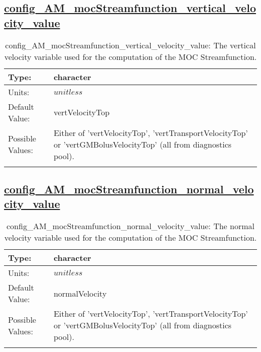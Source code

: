 \subsection[config\_AM\_mocStreamfunction\_vertical\_velocity\_value]{\hyperref[sec:nm_tab_AM_mocStreamfunction]{config\_AM\_mocStreamfunction\_vertical\_velocity\_value}}
\label{subsec:nm_sec_config_AM_mocStreamfunction_vertical_velocity_value}
\begin{center}
\begin{longtable}{| p{2.0in} || p{4.0in} |}
    \hline
    Type: & character \\
    \hline
    Units: & $unitless$ \\
    \hline
    Default Value: & vertVelocityTop \\
    \hline
    Possible Values: & Either of 'vertVelocityTop', 'vertTransportVelocityTop' or 'vertGMBolusVelocityTop' (all from diagnostics pool). \\
    \hline
    \caption{config\_AM\_mocStreamfunction\_vertical\_velocity\_value: The vertical velocity variable used for the computation of the MOC Streamfunction.}
\end{longtable}
\end{center}
\subsection[config\_AM\_mocStreamfunction\_normal\_velocity\_value]{\hyperref[sec:nm_tab_AM_mocStreamfunction]{config\_AM\_mocStreamfunction\_normal\_velocity\_value}}
\label{subsec:nm_sec_config_AM_mocStreamfunction_normal_velocity_value}
\begin{center}
\begin{longtable}{| p{2.0in} || p{4.0in} |}
    \hline
    Type: & character \\
    \hline
    Units: & $unitless$ \\
    \hline
    Default Value: & normalVelocity \\
    \hline
    Possible Values: & Either of 'vertVelocityTop', 'vertTransportVelocityTop' or 'vertGMBolusVelocityTop' (all from diagnostics pool). \\
    \hline
    \caption{config\_AM\_mocStreamfunction\_normal\_velocity\_value: The normal velocity variable used for the computation of the MOC Streamfunction.}
\end{longtable}
\end{center}
